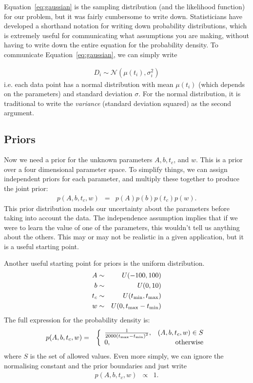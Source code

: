 Equation~\ref{eq:gaussian} is the sampling distribution
(and the likelihood function) for our problem, but it
was fairly cumbersome to write down. Statisticians have developed a shorthand
notation for writing down probability distributions, which is extremely useful
for communicating what assumptions you are making, without having to write down
the entire equation for the probability density. To communicate
Equation~\ref{eq:gaussian}, we can simply write

\begin{eqnarray}
D_i \sim \mathcal{N}\left(\mu(t_i), \sigma_i^2\right)
\end{eqnarray}
i.e. each data point has a normal distribution with mean $\mu(t_i)$ (which
depends on the parameters) and standard deviation $\sigma$. For the normal
distribution, it is traditional to write the {\it variance} (standard deviation
squared) as the second argument.

\subsection{Priors}
Now we need a prior for the unknown parameters $A, b, t_c$, and $w$. This is
a prior over a four dimensional parameter space. To simplify things, we can
assign independent priors for each parameter, and multiply these together
to produce the joint prior:
\begin{eqnarray}
p(A, b, t_c, w) &=& p(A)p(b)p(t_c)p(w).
\end{eqnarray}
This prior distribution models our uncertainty about the parameters before
taking into account the data. The independence assumption implies that if we
were to learn the value of one of the parameters, this wouldn't tell us anything
about the others. This may or may not be realistic in a given application, but
it is a useful starting point.

Another useful starting point for priors is the uniform distribution.
\begin{eqnarray}
A &\sim& U(-100, 100)\\
b &\sim& U(0, 10)\\
t_c &\sim& U(t_{\rm min}, t_{\rm max})\\
w &\sim& U(0, t_{\rm max} - t_{\rm min})
\end{eqnarray}
The full expression for the probability density is:
\begin{eqnarray}
p(A, b, t_c, w) &=&
\left\{
\begin{array}{lr}
\frac{1}{2000\left(t_{\rm max} - t_{\rm min}\right)^2}, & (A, b, t_c, w) \in S\\
0, & \textnormal{otherwise}
\end{array}
\right.
\end{eqnarray}
where $S$ is the set of allowed values. Even more simply, we can ignore the
normalising constant and the prior boundaries and just write
\begin{eqnarray}
p(A, b, t_c, w) &\propto& 1.
\end{eqnarray}




